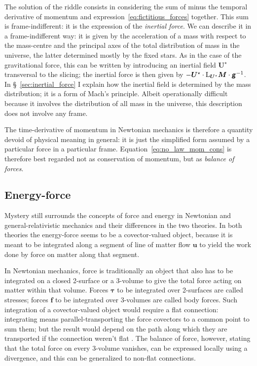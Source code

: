 \documentclass[\ifafour a4paper,12pt,\else a5paper,10pt,\fi%
onecolumn,oneside,article,%
british%
]{memoir}
\theoremstyle{remark}
\theoremstyle{innote}
\newcommand*{\mathte}[1]{\textbf{\textit{\textsf{#1}}}}
\newcommand*{\citep}{\parencites}
\renewcommand*{\|}{\nonscript\,\vert\nonscript\;\mathopen{}}
\newcommand*{\sect}{\S}%
\newcommand*{\Li}{\mathrm{L}}
\newcommand*{\yrr}{M}
\newcommand*{\yr}{\bm{\yrr}}
\newcommand*{\ycc}{u}
\newcommand*{\yc}{\bm{\ycc}}
\newcommand*{\yTT}{\tau}
\newcommand*{\yT}{\bm{\yTT}}
\newcommand*{\ybb}{f}
\newcommand*{\yb}{\bm{\ybb}}
\newcommand*{\yFF}{U}
\newcommand*{\yF}{\bm{\yFF}}
\newcommand*{\yFi}{\yF^{\mathord{\star}}}
\newcommand*{\ygg}{g}
\newcommand*{\yg}{\mathte{\ygg}}
\begin{document}
The solution of the riddle consists in considering the sum of minus the
temporal derivative of momentum and expression~\eqref{eq:fictitious_forces}
together. This sum is frame-indifferent: it is the expression of the
\emph{inertial force}. We can describe it in a frame-indifferent way: it is
given by the acceleration of a mass with respect to the mass-centre and the
principal axes of the total distribution of mass in the universe, the
latter determined mostly by the fixed stars. As in the case of the
gravitational force, this can be written by introducing an inertial field
$\yFi$ transversal to the slicing; the inertial force is then given by
$-\yFi \cdot \Li_{\yFi}\yr \cdot \yg^{-1}$. In
\sect~\ref{sec:inertial_force} I explain how the inertial field is
determined by the mass distribution; it is a form of Mach's principle.
Albeit operationally difficult because it involves the distribution of all
mass in the universe, this description does not involve any frame.

The time-derivative of momentum in Newtonian mechanics is therefore a
quantity devoid of physical meaning in general: it is just the simplified
form assumed by a particular force in a particular frame.
Equation~\eqref{eq:no_law_mom_cons} is therefore best regarded not as
conservation of momentum, but as \emph{balance of forces}.
\fi

\subsection{Energy-force}
\label{sec:force_balance_newton}

Mystery still surrounds the concepts of force and energy in Newtonian and
general-relativistic mechanics and their differences in the two theories.
In both theories the energy-force seems to be a covector-valued object,
because it is meant to be integrated along a segment of line of matter flow
$\yc$ to yield the work done by force on matter along that segment.

In Newtonian mechanics, force is traditionally an object that also has to
be integrated on a closed 2-surface or a 3-volume to give the total force
acting on matter within that volume. Forces $\yT$ to be integrated over
2-surfaces are called stresses; forces $\yb$ to be integrated over
3-volumes are called body forces. Such integration of a covector-valued
object would require a flat connection: integrating means
parallel-transporting the force covectors to a common point to sum them;
but the result would depend on the path along which they are transported if
the connection weren't flat \citep[\sect~238]{truesdelletal1960}. The
balance of force, however, stating that the total force on every 3-volume
vanishes, can be expressed locally using a divergence, and this can be
generalized to non-flat connections.
\end{document}
